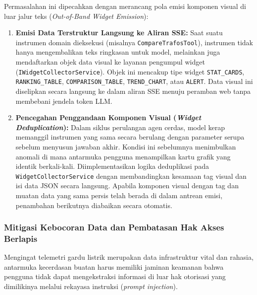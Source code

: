 Permasalahan ini dipecahkan dengan merancang pola emisi komponen visual di luar jalur teks (\textit{Out-of-Band Widget Emission}):
\begin{enumerate}[label=\arabic*., leftmargin=*, itemsep=0pt]
  \item \textbf{Emisi Data Terstruktur Langsung ke Aliran SSE:} Saat suatu instrumen domain dieksekusi (misalnya \texttt{CompareTrafosTool}), instrumen tidak hanya mengembalikan teks ringkasan untuk model, melainkan juga mendaftarkan objek data visual ke layanan pengumpul widget (\texttt{IWidgetCollectorService}). Objek ini mencakup tipe widget \texttt{STAT\_CARDS}, \texttt{RANKING\_TABLE}, \texttt{COMPARISON\_TABLE}, \texttt{TREND\_CHART}, atau \texttt{ALERT}. Data visual ini diselipkan secara langsung ke dalam aliran SSE menuju peramban web tanpa membebani jendela token LLM.
  \item \textbf{Pencegahan Penggandaan Komponen Visual (\textit{Widget Deduplication}):} Dalam siklus perulangan agen cerdas, model kerap memanggil instrumen yang sama secara berulang dengan parameter serupa sebelum menyusun jawaban akhir. Kondisi ini sebelumnya menimbulkan anomali di mana antarmuka pengguna menampilkan kartu grafik yang identik berkali-kali. Diimplementasikan logika deduplikasi pada \texttt{WidgetCollectorService} dengan membandingkan kesamaan tag visual dan isi data JSON secara langsung. Apabila komponen visual dengan tag dan muatan data yang sama persis telah berada di dalam antrean emisi, penambahan berikutnya diabaikan secara otomatis.
\end{enumerate}

\subsubsection{Mitigasi Kebocoran Data dan Pembatasan Hak Akses Berlapis}

Mengingat telemetri gardu listrik merupakan data infrastruktur vital dan rahasia, antarmuka kecerdasan buatan harus memiliki jaminan keamanan bahwa pengguna tidak dapat mengekstraksi informasi di luar hak otorisasi yang dimilikinya melalui rekayasa instruksi (\textit{prompt injection}).

